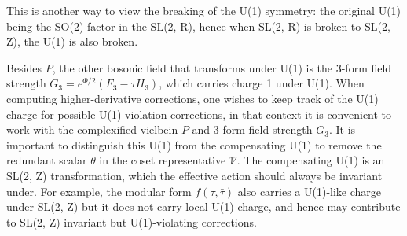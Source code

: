 This is another way to view the breaking of the U(1) symmetry: the original U(1) being the SO(2) factor in the SL(2, R), hence when SL(2, R) is broken to SL(2, Z), the U(1) is also broken.


Besides $P$, the other bosonic field that transforms under U(1) is the 3-form field strength $G_3 = e^{\Phi/2}(F_3 - \tau H_3)$, which carries charge 1 under U(1).
When computing higher-derivative corrections, one wishes to keep track of the U(1) charge for possible U(1)-violation corrections, in that context it is convenient to work with the complexified vielbein $P$ and 3-form field strength $G_3$.
It is important to distinguish this U(1) from the compensating U(1) to remove the redundant scalar $\theta$ in the coset representative $\mathcal{V}$. The compensating U(1) is an SL(2, Z) transformation, which the effective action should always be invariant under. For example, the modular form $f(\tau, \bar\tau)$ also carries a U(1)-like charge under SL(2, Z) but it does not carry local U(1) charge, and hence may contribute to SL(2, Z) invariant but U(1)-violating corrections.